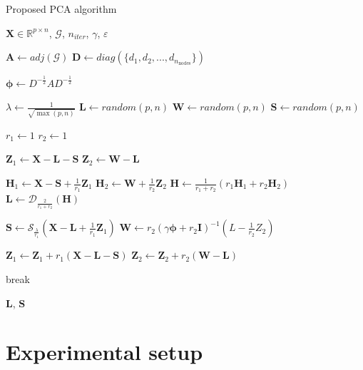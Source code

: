 \documentclass[sigconf]{acmart}
\begin{document}
  
  \begin{algorithm}[H]
  \caption{Proposed PCA algorithm}\label{alg:our_pca}
  \begin{algorithmic}
      \Require $\mathbf{X} \in \mathbb{R}^{p \times n}$, $\mathcal{G}$, $n_{iter}$, $\gamma$, $\varepsilon$
      
      \State $\mathbf{A} \gets adj(\mathcal{G})$
      \State $\mathbf{D} \gets diag(\{d_1, d_2, ..., d_{n_{\text{nodes}}}\})$
      
      \State $\bm{\phi} \gets D^{-\frac{1}{2}} A D^{-\frac{1}{2}} $
      
      \State $\lambda \gets \frac{1}{\sqrt{\max(p, n)}}$
      \State $\mathbf{L} \gets random(p, n)$
      \State $\mathbf{W} \gets random(p, n)$
      \State $\mathbf{S} \gets random(p, n)$
      
      \State $r_1 \gets 1$
      \State $r_2 \gets 1$
      
      \State $\mathbf{Z}_1 \gets \mathbf{X} - \mathbf{L} - \mathbf{S}$
      \State $\mathbf{Z}_2 \gets \mathbf{W} - \mathbf{L}$
      
          \State $\mathbf{H}_1 \gets \mathbf{X} - \mathbf{S} + \frac{1}{r_1}\mathbf{Z}_1$
          \State $\mathbf{H}_2 \gets \mathbf{W} + \frac{1}{r_2}\mathbf{Z}_2$
          \State $\mathbf{H} \gets \frac{1}{r_1 + r_2} (r_1 \mathbf{H}_1 + r_2 \mathbf{H}_2)$
          \State $\mathbf{L} \gets \mathcal{D}_{\frac{2}{r_1 + r_2}}(\mathbf{H})$
      
          \State $\mathbf{S} \gets \mathcal{S}_{\frac{\lambda}{r_1}}(\mathbf{X} - \mathbf{L} + \frac{1}{r_1}\mathbf{Z}_1)$
          \State $\mathbf{W} \gets r_2 (\gamma \bm{\phi} + r_2 \mathbf{I})^{-1}(L - \frac{1}{r_2}Z_2)$
          
          \State $\mathbf{Z}_1 \gets \mathbf{Z}_1 + r_1(\mathbf{X} - \mathbf{L} - \mathbf{S})$
          \State $\mathbf{Z}_2 \gets \mathbf{Z}_2 + r_2(\mathbf{W} - \mathbf{L})$
      
              \State break\
          \EndIf
      
      \EndFor
      
      \State \Return $\mathbf{L}$, $\mathbf{S}$
  \end{algorithmic}
  \end{algorithm}




\section{Experimental setup}
\end{document}
